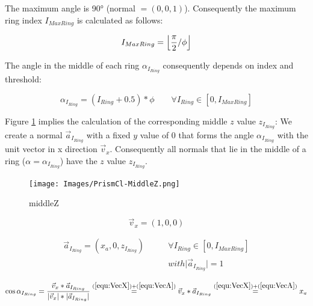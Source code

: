 \documentclass[../ClassicThesis.tex]{subfiles}
\begin{document}
The maximum angle is 90° (normal $ = (0,0,1)$). Consequently the maximum ring index $I_{MaxRing}$ is calculated as follows:

\begin{equation*}
    I_{MaxRing} = \floor*{
                    \frac{\pi}{2}
                    / \phi
                  }
\end{equation*}



The angle in the middle of each ring ${\alpha}_{I_{Ring}}$ consequently depends on index and threshold:

\begin{equation}
\label{equ:AlphaIRing}
    {\alpha}_{I_{Ring}} = (I_{Ring} + 0.5) * \phi \qquad \forall{ I_{Ring} \in [0, I_{MaxRing}] }
\end{equation}



Figure \ref{fig:middleZ} implies the calculation of the corresponding middle $z$ value $z_{I_{Ring}}$: We create a normal $\vec{a}_{I_{Ring}}$ with a fixed $y$ value of 0 that forms the angle ${\alpha}_{I_{Ring}}$ with the unit vector in x direction $\vec{v}_{x}$. Consequently all normals that lie in the middle of a ring ($\alpha = {\alpha}_{I_{Ring}}$) have the $z$ value $z_{I_{Ring}}$.

\begin{figure}
    \texttt{[image: Images/PrismCl-MiddleZ.png]}
    \caption{middleZ}
    \label{fig:middleZ}
\end{figure}

\begin{equation}
\label{equ:VecX}
    \vec{v}_{x} = (1, 0, 0)
\end{equation}

\begin{equation}
\begin{split}
    \label{equ:VecA}
    \vec{a}_{I_{Ring}} = (x_{a}, 0, z_{I_{Ring}}) \qquad  & \forall{ I_{Ring} \in [0, I_{MaxRing}] } \\
    & with \vert \vec{a}_{I_{Ring}} \vert = 1
\end{split}
\end{equation}

\begin{equation}
    \label{equ:XA}
    \cos{{\alpha}_{I_{Ring}}} = \frac{ \vec{v}_{x} * \vec{a}_{I_{Ring}} }{ \vert \vec{v}_{x} \vert * \vert \vec{a}_{I_{Ring}} \vert }
    \stackrel{(\ref{equ:VecX}) + (\ref{equ:VecA})}{=} \vec{v}_{x} * \vec{a}_{I_{Ring}}
    \stackrel{(\ref{equ:VecX}) + (\ref{equ:VecA})}{=} x_{a}
\end{equation}
\end{document}
